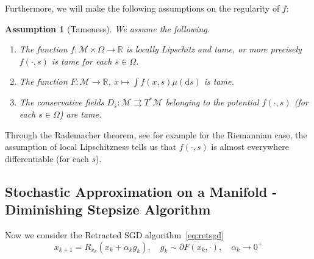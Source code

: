\documentclass{article}
\newtheorem{assumption}{Assumption}
\newcommand{\CM}{\mathcal{M}}
\newcommand{\BR}{\mathbb{R}}
\newcommand{\rd}{\mathrm{d}}
\begin{document}
Furthermore, we will make the following assumptions on the regularity of $f$:
\begin{assumption}[Tameness]\label{assum_tameness}
    We assume the following.
    \begin{enumerate}
        \item The function $f:\CM\times\Omega\to\BR$ is locally Lipschitz and tame, or more precisely $f(\cdot,s)$ is tame for each $s\in\Omega$. 
        \item The function $F:\CM\to\BR$, $x\mapsto \int f(x,s)\mu(\rd s)$ is tame. 
        \item The conservative fields $D_s:\CM\rightrightarrows T^*\CM$ belonging to the potential $f(\cdot,s)$ (for each $s\in\Omega$) are tame. 
    \end{enumerate}
\end{assumption}

Through the Rademacher theorem, see for example \cite[Thm. 5.7]{azagra2005nonsmooth} for the Riemannian case, the assumption of local Lipschitzness tells us that $f(\cdot,s)$ is almost everywhere differentiable (for each $s$). 


\subsection{Stochastic Approximation on a Manifold - Diminishing Stepsize Algorithm}
Now we consider the Retracted SGD algorithm~\eqref{eq:retsgd}
\begin{equation}\label{eq:retsgddimsz}
x_{k+1}=R_{x_k}(x_k+\alpha_k g_k),\quad g_k\sim \partial F(x_k,\cdot),\quad\alpha_k\to 0^+
\end{equation}
\end{document}
